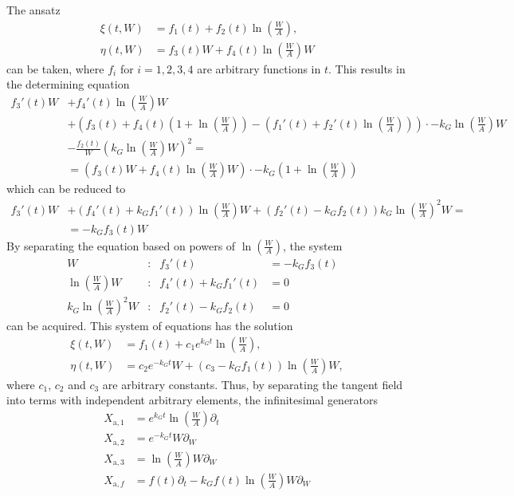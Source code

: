 The ansatz
\begin{align*}
  \xi(t, W) &= f_1(t) + f_2(t) \ln(\frac{W}{A}),\\
  \eta(t, W) &= f_3(t) W + f_4(t) \ln(\frac{W}{A}) W
\end{align*}
can be taken, where \(f_i\) for \(i =1,2,3,4\) are arbitrary functions in \(t\).
This results in the determining equation
\begin{align*}
  f_3'(t) W &+ f_4'(t) \ln(\frac{W}{A}) W \\
  &+ \left( f_3(t) + f_4(t) \left( 1 + \ln(\frac{W}{A}) \right) - \left( f_1'(t) + f_2'(t) \ln(\frac{W}{A}) \right) \right) \cdot -k_G \ln(\frac{W}{A}) W \\
  &- \frac{f_2(t)}{W} \left( k_G \ln(\frac{W}{A}) W \right)^2 =\\
  &= \left( f_3(t) W + f_4(t) \ln(\frac{W}{A}) W \right) \cdot -k_G \left( 1 + \ln(\frac{W}{A}) \right)
\end{align*}
which can be reduced to
\begin{align*}
  f_3'(t) W &+ \left( f_4'(t) + k_G f_1'(t) \right) \ln(\frac{W}{A}) W + \left( f_2'(t) - k_G f_2(t) \right) k_G \ln(\frac{W}{A})^2 W =\\
  &= - k_G f_3(t) W
\end{align*}
By separating the equation based on powers of \(\ln(\frac{W}{A})\), the system
\begin{subequations}
  \begin{flalign}
    W & : & f_3'(t) &= -k_G f_3(t) &\label{eq:W}\\
    \ln(\frac{W}{A}) W & : & f_4'(t) + k_G f_1'(t) &= 0 &\label{eq:WA}\\
    k_G \ln(\frac{W}{A})^2 W & : & f_2'(t) - k_G f_2(t) &= 0 &\label{eq:kW2A2W}
  \end{flalign}
\end{subequations}
can be acquired.
This system of equations has the solution
\begin{align*}
  \xi(t, W) &= f_1(t) + c_1 e^{k_G t} \ln(\frac{W}{A}),\\
  \eta(t, W) &= c_2 e^{-k_G t} W + \left( c_3 - k_G f_1(t) \right) \ln(\frac{W}{A}) W,
\end{align*}
where \(c_1\), \(c_2\) and \(c_3\) are arbitrary constants.
Thus, by separating the tangent field into terms with independent arbitrary elements, the infinitesimal generators
\begin{align*}
  X_{\text{a},1} &= e^{k_G t} \ln(\frac{W}{A}) \partial_t \\
  X_{\text{a},2} &= e^{-k_G t} W \partial_W \\
  X_{\text{a},3} &= \ln(\frac{W}{A}) W \partial_W \\
  X_{\text{a},f} &= f(t) \partial_t - k_G f(t) \ln(\frac{W}{A}) W \partial_W
\end{align*}
